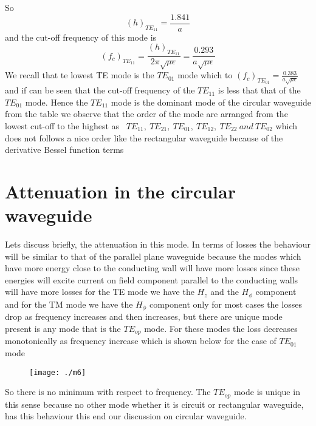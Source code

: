       So
      $$(h)_{TE_{11}} = \frac{1.841}{a}$$
      and the cut-off frequency of this mode is 
      $$(f_c)_{TE_{11}} = \frac{(h)_{TE_{11}}}{2\pi\sqrt{\mu\epsilon}} = \frac{0.293}{a\sqrt{\mu\epsilon}}$$	
      We recall that te lowest TE mode is the $TE_{01}$ mode which  to $(f_c)_{TE_{01}} = \frac{0.383}{a\sqrt{\mu\epsilon}}$ and if can be seen that the cut-off frequency of the $TE_{11}$ is less that that of the $TE_{01}$
      mode. Hence the $TE_{11}$ mode is the dominant mode of the circular waveguide from the table we observe that the order of the mode are arranged from the lowest cut-off to the highest as \  $TE_{11}, \  TE_{21}, \ TE_{01}, \ TE_{12}, \ TE_{22} \ and \ TE_{02}$ which does not follows a nice order like the rectangular waveguide because of the derivative Bessel function terms
      \section{Attenuation in the circular waveguide}
      Lets discuss briefly, the attenuation in this mode. In terms of losses the behaviour will be similar to that of the parallel plane waveguide because the modes which have more energy close to the conducting wall will have more losses since these energies will excite current on field component parallel to the conducting walls will have more losses for the TE mode we have the $H_z$ and the $H_\phi$ component and for the TM mode we have the $H_\phi$ component only for most cases the losses drop as frequency increases and then increases, but there are unique mode present is any mode that is the $TE_{op}$ mode. For these modes the loss decreases monotonically as frequency increase which is shown below for the case of $TE_{01}$ mode 
      \begin{figure}[H]
      	\centering
      	\texttt{[image: ./m6]}
      	\caption{}
      	\label{fig:m6}
      \end{figure}
      So there is no minimum with respect to frequency. The $TE_{op}$ mode is unique in this sense because no other mode whether it is circuit or rectangular waveguide, has this behaviour this end our discussion on circular waveguide.